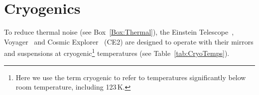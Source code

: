 \chapter{Cryogenics}
\label{sec:Cryogenics}
\vspace{1cm} 


To reduce thermal noise (see Box~\ref{Box:Thermal}), the Einstein Telescope~\cite{ET2011}, Voyager~\cite{Voyager:Inst} and Cosmic Explorer~\cite{CosmicExplorer2017} (\ac{CE2}) are designed to operate with their mirrors and suspensions at cryogenic\footnote{Here we use the term cryogenic to refer to temperatures significantly below room temperature, including 123\,K.} temperatures (see Table~\ref{tab:CryoTemps}).


